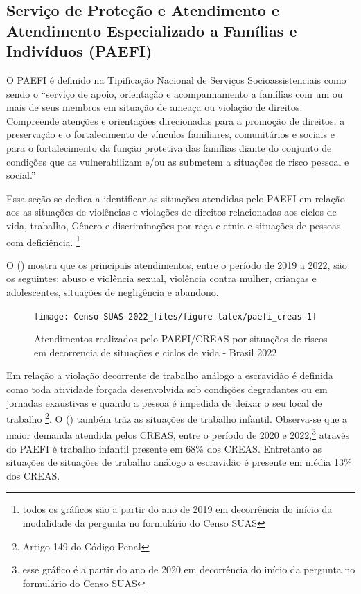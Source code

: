 \documentclass[
  brazilian]{report}
\begin{document}
\hypertarget{serviuxe7o-de-proteuxe7uxe3o-e-atendimento-e-atendimento-especializado-a-famuxedlias-e-indivuxedduos-paefi}{%
\subsection{Serviço de Proteção e Atendimento e Atendimento
Especializado a Famílias e Indivíduos
(PAEFI)}\label{serviuxe7o-de-proteuxe7uxe3o-e-atendimento-e-atendimento-especializado-a-famuxedlias-e-indivuxedduos-paefi}}

O PAEFI é definido na Tipificação Nacional de Serviços
Socioassistenciais como sendo o ``serviço de apoio, orientação e
acompanhamento a famílias com um ou mais de seus membros em situação de
ameaça ou violação de direitos. Compreende atenções e orientações
direcionadas para a promoção de direitos, a preservação e o
fortalecimento de vínculos familiares, comunitários e sociais e para o
fortalecimento da função protetiva das famílias diante do conjunto de
condições que as vulnerabilizam e/ou as submetem a situações de risco
pessoal e social.''

Essa seção se dedica a identificar as situações atendidas pelo PAEFI em
relação aos as situações de violências e violações de direitos
relacionadas aos ciclos de vida, trabalho, Gênero e discriminações por
raça e etnia e situações de pessoas com deficiência.
\footnote{todos os gráficos são a partir do ano de 2019 em decorrência do início da modalidade da pergunta no formulário do Censo SUAS}

O () mostra que os principais atendimentos, entre
o período de 2019 a 2022, são os seguintes: abuso e violência sexual,
violência contra mulher, crianças e adolescentes, situações de
negligência e abandono.

\begin{figure}
\texttt{[image: Censo-SUAS-2022\_files/figure-latex/paefi\_creas-1]} \caption[Atendimentos realizados pelo PAEFI/CREAS por situações de riscos em decorrencia de situações e ciclos de vida - Brasil  2022]{Atendimentos realizados pelo PAEFI/CREAS por situações de riscos em decorrencia de situações e ciclos de vida - Brasil  2022}\label{fig:paefi_creas}
\end{figure}

Em relação a violação decorrente de trabalho análogo a escravidão é
definida como toda atividade forçada desenvolvida sob condições
degradantes ou em jornadas exaustivas e quando a pessoa é impedida de
deixar o seu local de trabalho \footnote{Artigo 149 do Código Penal}. O
() também tráz as situações de trabalho infantil.
Observa-se que a maior demanda atendida pelos CREAS, entre o período de
2020 e
2022,\footnote{esse gráfico é a partir do ano de 2020 em decorrência do início da pergunta no formulário do Censo SUAS}
através do PAEFI é trabalho infantil presente em 68\% dos CREAS.
Entretanto as situações de situações de trabalho análogo a escravidão é
presente em média 13\% dos CREAS.
\end{document}
